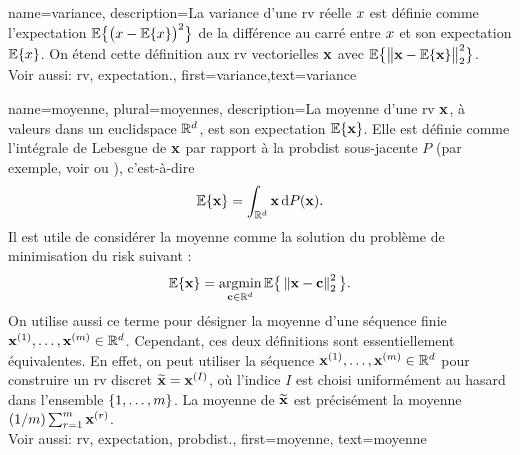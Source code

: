 {
	name={variance},
	description={La variance d’une \gls{rv} réelle $x$ est définie comme l’\gls{expectation} 
		$\mathbb{E}\big\{ \big( x - \mathbb{E}\{x \} \big)^{2} \big\}$ de la différence au carré entre $x$ 
		et son \gls{expectation} $\mathbb{E}\{x \}$. On étend cette définition aux \gls{rv} vectorielles ${\bf x}$ 
		avec $\mathbb{E}\big\{ \big\| {\bf x} - \mathbb{E}\{{\bf x} \} \big\|_{2}^{2} \big\}$.
		\\ 
		Voir aussi: \gls{rv}, \gls{expectation}.},
	first={variance},text={variance} 
}

{name={moyenne}, plural={moyennes},
	description={La  moyenne d'une \gls{rv} ${\bf x}$, à valeurs dans un \gls{euclidspace} $\mathbb{R}^{d}$, est son 
		\gls{expectation} $\mathbb{E}\{{\bf x}\}$. Elle est définie comme l'intégrale de Lebesgue 
		de ${\bf x}$ par rapport à la \gls{probdist} sous-jacente $P$ (par exemple, 
		voir \cite{RudinBookPrinciplesMatheAnalysis} ou \cite{BillingsleyProbMeasure}), c’est-à-dire
		\[
		\mathbb{E}\{{\bf x}\} = \int_{\mathbb{R}^{d}} {\bf x} \, \mathrm{d}P({\bf x}).
		\] 
		Il est utile de considérer la moyenne comme la solution du problème de minimisation du \gls{risk} suivant \cite{BertsekasProb}:
		\[
		\mathbb{E}\{{\bf x}\} = \operatorname*{argmin}_{{\bf c} \in \mathbb{R}^{d}} 
		\mathbb{E} \big\{\left\Vert {{\bf x}- {\bf c}} \right\Vert_{2}^{2}\big \}.
		\] 
		On utilise aussi ce terme pour désigner la moyenne d'une séquence finie 
		${\bf x}^{(1)}, \ldots, {\bf x}^{(m)} \in \mathbb{R}^{d}$. Cependant, 
		ces deux définitions sont essentiellement équivalentes. En effet, on peut utiliser la séquence 
		${\bf x}^{(1)}, \ldots, {\bf x}^{(m)} \in \mathbb{R}^{d}$ pour construire un 
		\gls{rv} discret $\widetilde{{\bf x}}={\bf x}^{(I)}$, où l'indice $I$ est choisi uniformément 
		au hasard dans l'ensemble $\{1, \ldots, m\}$. La moyenne de $\widetilde{{\bf x}}$ est 
		précisément la moyenne $({1}/{m}) \sum_{r=1}^{m} {\bf x}^{(r)}$.
		\\ 
		Voir aussi: \gls{rv}, \gls{expectation}, \gls{probdist}.}, 
	first={moyenne}, 
	text={moyenne} 
}

